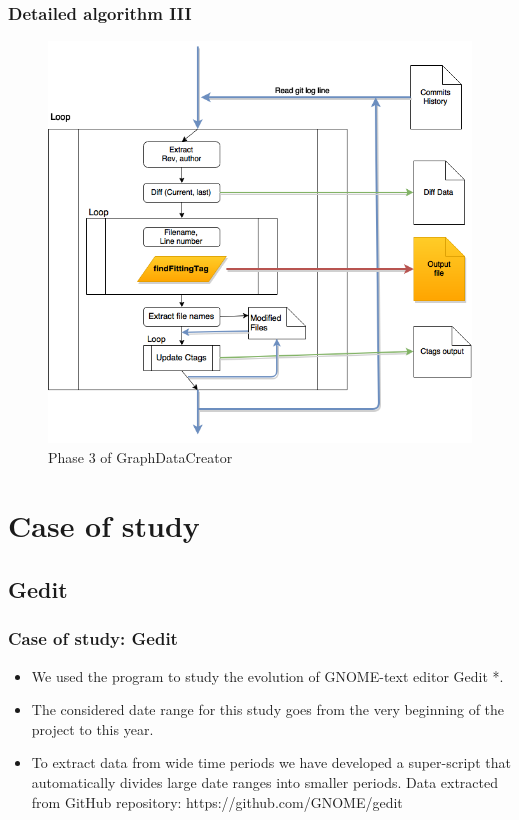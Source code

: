 \documentclass{beamer}
\begin{document}

\begin{frame}
\frametitle{Detailed algorithm III}
\begin{figure}
\includegraphics[scale=0.3]{GDCphase2.png} 
\caption{Phase 3 of GraphDataCreator}
\label{fig:phase3}
\end{figure}
\end{frame}

\section{Case of study}
\subsection{Gedit}
\begin{frame}
\frametitle{Case of study: Gedit}
\begin{itemize}
\item We used the program to study the evolution of GNOME-text editor Gedit *.
\item The considered date range for this study goes from the very beginning of the project to this year.
\item To extract data from wide time periods we have developed a super-script that automatically divides large date ranges into smaller periods.
\text * Data extracted from GitHub repository: https://github.com/GNOME/gedit
\end{itemize}
\end{frame}
\end{document}
